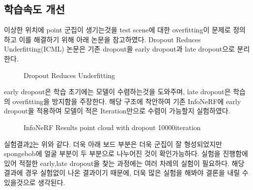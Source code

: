 \documentclass{vipweekly}
\begin{document}
\subsection{학습속도 개선} 

이상한 위치에 point 군집이 생기는것을 test scene에 대한 overfitting이 문제로 정의하고
이를 해결하기 위해 아래 논문을 참고하였다.
Dropout Reduces Underfitting(ICML)\cite{Dropout} 논문은 기존 dropout을 
early dropout과 late dropout으로 분리한다.

\begin{figure}[h]
    \centering
    \hfill
    \caption{Dropout Reduces Underfitting}
    \label{fig:dropout}
\end{figure}

early dropout은 학습 초기에는 모델이 수렴하는것을 도와주며, late dropout은 학습의 overfitting을 방지함을 주장한다.
해당 구조에 착안하여 기존 InfoNeRF에 early dropout을 적용하여 모델이 적은 Iteration만으로 수렴이 가능할지 실험하였다.



\begin{figure}[h]
    \centering
    \hfill
    \caption{InfoNeRF Results point cloud with dropout 10000iteration}
    \label{fig:dropout_pc}
\end{figure}

\newpage


실험결과\ref{fig:dropout_pc}는 위와 같다. 더욱 아래 보드 부분은 더욱 군집이 잘 형성되었지만 
spongebob에 얼굴 부분이 두 부분으로 나누어진 것이 확인가능하다. 
실험을 진행함에 있어 적절한 early,late dropout을 찾는 과정에는 여러 차례의 실험이 필요하다.
해당 결과에 경우 실험없이 나온 결과이기 때문에, 더욱 많은 실험을 해봐야 결론을 내릴 수 있을것으로 생각된다. 
\end{document}
